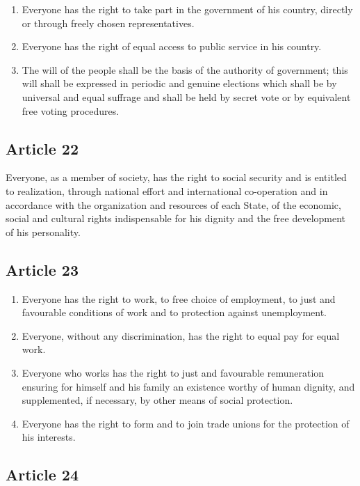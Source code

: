 \documentclass[
  ngerman,
  american,
  titlepage,
  openright,
  DIV=calc,
  toc=listof,
  listof=nochaptergap]{scrbook}
\begin{document}
\begin{enumerate}
\def\labelenumi{\arabic{enumi}.}
\item
  Everyone has the right to take part in the government of his country,
  directly or through freely chosen representatives.
\item
  Everyone has the right of equal access to public service in his
  country.
\item
  The will of the people shall be the basis of the authority of
  government; this will shall be expressed in periodic and genuine
  elections which shall be by universal and equal suffrage and shall be
  held by secret vote or by equivalent free voting procedures.
\end{enumerate}

\subsection{Article 22}\label{article-22-1}

Everyone, as a member of society, has the right to social security and
is entitled to realization, through national effort and international
co-operation and in accordance with the organization and resources of
each State, of the economic, social and cultural rights indispensable
for his dignity and the free development of his personality.

\subsection{Article 23}\label{article-23-1}

\begin{enumerate}
\def\labelenumi{\arabic{enumi}.}
\item
  Everyone has the right to work, to free choice of employment, to just
  and favourable conditions of work and to protection against
  unemployment.
\item
  Everyone, without any discrimination, has the right to equal pay for
  equal work.
\item
  Everyone who works has the right to just and favourable remuneration
  ensuring for himself and his family an existence worthy of human
  dignity, and supplemented, if necessary, by other means of social
  protection.
\item
  Everyone has the right to form and to join trade unions for the
  protection of his interests.
\end{enumerate}

\subsection{Article 24}\label{article-24-1}
\end{document}
